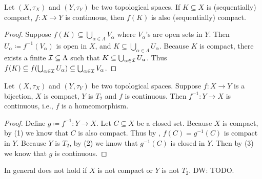 \documentclass{techreport}
\newcommand{\diw}[1]{{\color{Red} DW: #1}}
\begin{document}
\begin{proposition}\label{Prop:ContFuncPreserveCompact}
	Let $(X,\tau_X)$ and $(Y,\tau_Y)$ be two topological spaces.
	If $K \subseteq X$ is (sequentially) compact, $f : X \to Y$ is continuous, then $f(K)$ is also (sequentially) compact.
\end{proposition}
\begin{proof}
	Suppose $f(K) \subseteq \bigcup_{\alpha \in \Lambda} V_\alpha$ where $V_\alpha$'s are open sets in $Y$.
	Then $U_\alpha \coloneqq f^{-1}(V_\alpha)$ is open in $X$, and $K \subseteq \bigcup_{\alpha \in \Lambda} U_\alpha$.
	Because $K$ is compact, there exists a finite $\mathcal{I} \subseteq \Lambda$ such that $K \subseteq \bigcup_{\alpha \in \mathcal{I}} U_\alpha$.
	Thus $f(K) \subseteq f(\bigcup_{\alpha \in \mathcal{I}} U_\alpha) \subseteq \bigcup_{\alpha \in \mathcal{I}} V_\alpha$.
\end{proof}

\begin{proposition}\label{Prop:ContBijectionFromCompactToT2IsHome}
	Let $(X,\tau_X)$ and $(Y,\tau_Y)$ be two topological spaces.
	Suppose $f : X \to Y$ is a bijection, $X$ is compact, $Y$ is $T_2$ and $f$ is continuous.
	Then $f^{-1} : Y \to X$ is continuous, i.e., $f$ is a homeomorphism.
\end{proposition}
\begin{proof}
	Define $g \coloneqq f^{-1} : Y \to X$.
	Let $C \subseteq X$ be a closed set.
	Because $X$ is compact, by (1) we know that $C$ is also compact.
	Thus by , $f(C) = g^{-1}(C)$ is compact in $Y$.
	Because $Y$ is $T_2$, by (2) we know that $g^{-1}(C)$ is closed in $Y$.
	Then by (3) we know that $g$ is continuous.
\end{proof}

\begin{example}\label{Exa:ContBijectionNotHome}
	In general  does not hold if $X$ is not compact or $Y$ is not $T_2$.
	\diw{TODO.}
\end{example}
\end{document}
